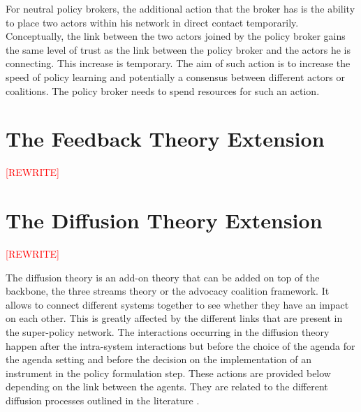 For neutral policy brokers, the additional action that the broker has is the ability to place two actors within his network in direct contact temporarily. Conceptually, the link between the two actors joined by the policy broker gains the same level of trust as the link between the policy broker and the actors he is connecting. This increase is temporary. The aim of such action is to increase the speed of policy learning and potentially a consensus between different actors or coalitions. The policy broker needs to spend resources for such an action.


%
\section{The Feedback Theory Extension}
\label{sec:feedbackExtension}

\textcolor{red}{[REWRITE]}


%
\section{The Diffusion Theory Extension}
\label{sec:diffusionExtension}

\textcolor{red}{[REWRITE]}

The diffusion theory is an add-on theory that can be added on top of the backbone, the three streams theory or the advocacy coalition framework. It allows to connect different systems together to see whether they have an impact on each other. This is greatly affected by the different links that are present in the super-policy network. The interactions occurring in the diffusion theory happen after the intra-system interactions but before the choice of the agenda for the agenda setting and before the decision on the implementation of an instrument in the policy formulation step. These actions are provided below depending on the link between the agents. They are related to the different diffusion processes outlined in the literature \citep{berry1999innovation}.
 
